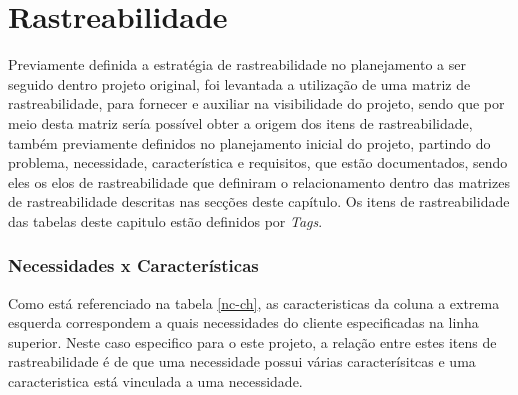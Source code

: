 \chapter{Rastreabilidade}

\label{sec:rastreabilidade}
Previamente definida a estratégia de rastreabilidade no planejamento a ser seguido dentro projeto original, foi levantada a utilização de uma matriz de rastreabilidade, para fornecer e auxiliar na visibilidade do projeto, sendo que por meio desta matriz sería possível obter a origem dos itens de rastreabilidade, também previamente definidos no planejamento inicial do projeto, partindo do problema, necessidade, característica e requisitos, que estão documentados, sendo eles os elos de rastreabilidade que definiram o relacionamento dentro das matrizes de rastreabilidade descritas nas secções deste capítulo. Os itens de rastreabilidade  das tabelas deste capitulo estão definidos por \textit{Tags}.


\subsection{Necessidades x Características}

Como está referenciado na tabela \ref{nc-ch}, as caracteristicas da coluna a extrema esquerda correspondem a quais necessidades do cliente especificadas na linha superior. Neste caso especifico para o este projeto, a relação entre estes itens de rastreabilidade é de que uma necessidade possui várias caracterísitcas e uma caracteristica está vinculada a uma necessidade.

